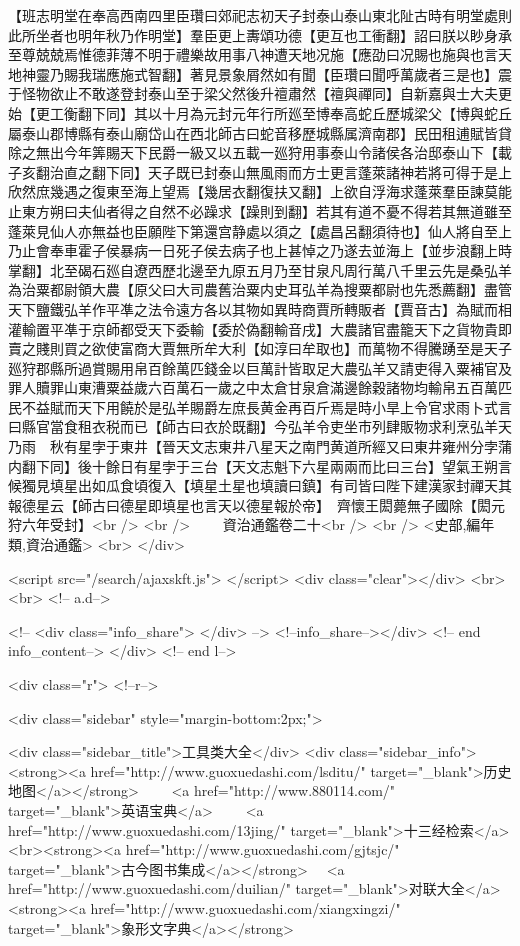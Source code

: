 【班志明堂在奉高西南四里臣瓚曰郊祀志初天子封泰山泰山東北阯古時有明堂處則此所坐者也明年秋乃作明堂】羣臣更上夀頌功德【更互也工衝翻】詔曰朕以眇身承至尊兢兢焉惟德菲薄不明于禮樂故用事八神遭天地况施【應劭曰况賜也施與也言天地神靈乃賜我瑞應施式智翻】著見景象屑然如有聞【臣瓚曰聞呼萬歲者三是也】震于怪物欲止不敢遂登封泰山至于梁父然後升䄠肅然【䄠與禪同】自新嘉與士大夫更始【更工衡翻下同】其以十月為元封元年行所廵至博奉高蛇丘歷城梁父【博與蛇丘屬泰山郡博縣有泰山廟岱山在西北師古曰蛇音移歷城縣属濟南郡】民田租逋賦皆貸除之無出今年筭賜天下民爵一級又以五載一廵狩用事泰山令諸侯各治邸泰山下【載子亥翻治直之翻下同】天子既已封泰山無風雨而方士更言蓬萊諸神若將可得于是上欣然庶幾遇之復東至海上望焉【幾居衣翻復扶又翻】上欲自浮海求蓬萊羣臣諫莫能止東方朔曰夫仙者得之自然不必躁求【躁則到翻】若其有道不憂不得若其無道雖至蓬萊見仙人亦無益也臣願陛下第還宫静處以須之【處昌呂翻須待也】仙人將自至上乃止會奉車霍子侯暴病一日死子侯去病子也上甚悼之乃遂去並海上【並步浪翻上時掌翻】北至碣石廵自遼西歷北邊至九原五月乃至甘泉凡周行萬八千里云先是桑弘羊為治粟都尉領大農【原父曰大司農舊治粟内史耳弘羊為搜粟都尉也先悉薦翻】盡管天下鹽鐵弘羊作平凖之法令遠方各以其物如異時商賈所轉販者【賈音古】為賦而相灌輸置平凖于京師都受天下委輸【委於偽翻輸音戌】大農諸官盡籠天下之貨物貴即賣之賤則買之欲使富商大賈無所牟大利【如淳曰牟取也】而萬物不得騰踴至是天子廵狩郡縣所過賞賜用帛百餘萬匹錢金以巨萬計皆取足大農弘羊又請吏得入粟補官及罪人贖罪山東漕粟益歲六百萬石一歲之中太倉甘泉倉滿邊餘穀諸物均輸帛五百萬匹民不益賦而天下用饒於是弘羊賜爵左庶長黄金再百斤焉是時小旱上令官求雨卜式言曰縣官當食租衣税而已【師古曰衣於既翻】今弘羊令吏坐市列肆販物求利烹弘羊天乃雨　秋有星孛于東井【晉天文志東井八星天之南門黄道所經又曰東井雍州分孛蒲内翻下同】後十餘日有星孛于三台【天文志魁下六星兩兩而比曰三台】望氣王朔言候獨見填星出如瓜食頃復入【填星土星也填讀曰鎮】有司皆曰陛下建漢家封禪天其報德星云【師古曰德星即填星也言天以德星報於帝】　齊懷王閎薨無子國除【閎元狩六年受封】<br />
<br />
　　資治通鑑卷二十<br />
<br />
<史部,編年類,資治通鑑>  <br>
   </div> 

<script src="/search/ajaxskft.js"> </script>
 <div class="clear"></div>
<br>
<br>
 <!-- a.d-->

 <!--
<div class="info_share">
</div> 
-->
 <!--info_share--></div>   <!-- end info_content-->
  </div> <!-- end l-->

<div class="r">   <!--r-->



<div class="sidebar"  style="margin-bottom:2px;">

 
<div class="sidebar_title">工具类大全</div>
<div class="sidebar_info">
<strong><a href="http://www.guoxuedashi.com/lsditu/" target="_blank">历史地图</a></strong>　　
<a href="http://www.880114.com/" target="_blank">英语宝典</a>　　
<a href="http://www.guoxuedashi.com/13jing/" target="_blank">十三经检索</a>　
<br><strong><a href="http://www.guoxuedashi.com/gjtsjc/" target="_blank">古今图书集成</a></strong>　
<a href="http://www.guoxuedashi.com/duilian/" target="_blank">对联大全</a>　<strong><a href="http://www.guoxuedashi.com/xiangxingzi/" target="_blank">象形文字典</a></strong>　

